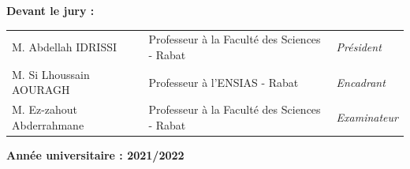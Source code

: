 \documentclass[11pt,french]{report}
\begin{document}
\begin{titlepage}
\begin{center}
\noindent \Large{\textbf{Devant le jury :}}  \\[0.3cm]

\begin{flushleft}
\begin{tabular}{@{}lll}

\Large{M. Abdellah IDRISSI}  &  \Large{Professeur à la Faculté des Sciences  - Rabat} & \Large{\textit{Président}}	\\[0.1cm]
\Large{M. Si Lhoussain AOURAGH }   &  \Large{Professeur à l'ENSIAS -           Rabat} & \Large{\textit{Encadrant}}	\\
\Large{M. Ez-zahout Abderrahmane}  &  \Large{Professeur à la Faculté des Sciences  - Rabat} & \Large{\textit{Examinateur}}	\\[0.1cm]

\end{tabular}
\end{flushleft}

\vspace*{0.5cm}
\textbf{\large{Année universitaire : 2021/2022}}

\end{center}

\end{titlepage}






\newpage
\tableofcontents
\end{document}
